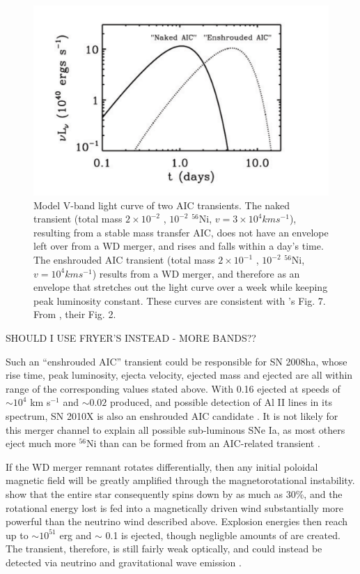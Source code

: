 \begin{figure}
\centerline{\includegraphics[width=0.8\hsize]{AICtrans.pdf}}
\caption{Model V-band light curve of two AIC transients.  The naked transient (total mass $2 \times 10^{-2}$ {\Msun}, $10^{-2}$ {\Msun} $^{56}$Ni, $v = 3 \times 10^4 km s^{-1}$), resulting from a stable mass transfer AIC, does not have an envelope left over from a WD merger, and rises and falls within a day's time.  The enshrouded AIC transient (total mass $2 \times 10^{-1}$ {\Msun}, $10^{-2}$ {\Msun} $^{56}$Ni, $v = 10^4 km s^{-1}$) results from a WD merger, and therefore as an envelope that stretches out the light curve over a week while keeping peak luminosity constant.  These curves are consistent with \cite{frye+09}'s Fig. 7.  From \cite{metz+09}, their Fig. 2.}
\label{AICtrans}
\end{figure}

SHOULD I USE FRYER'S INSTEAD - MORE BANDS??

Such an ``enshrouded AIC'' transient could be responsible for SN 2008ha, whose rise time, peak luminosity, ejecta velocity, ejected mass and ejected {\Ni} are all within range of the corresponding values stated above.  With 0.16 {\Msun} ejected at speeds of $\sim 10^4$ km s$^{-1}$ and $\sim 0.02$ {\Msun} {\Ni} produced, and possible detection of Al II lines in its spectrum, SN 2010X is also an enshrouded AIC candidate \citep{kasl+10}.  It is not likely for this merger channel to explain all possible sub-luminous SNe Ia, as most others eject much more $^{56}$Ni than can be formed from an AIC-related transient \citep{fole+09}.

If the WD merger remnant rotates differentially, then any initial poloidal magnetic field will be greatly amplified through the magnetorotational instability.  \cite{dess+07} show that the entire star consequently spins down by as much as 30\%, and the rotational energy lost is fed into a magnetically driven wind substantially more powerful than the neutrino wind described above.  Explosion energies then reach up to $\sim 10^{51}$ erg and $\sim$ 0.1 {\Msun} is ejected, though negligble amounts of {\Ni} are created.  The transient, therefore, is still fairly weak optically, and could instead be detected via neutrino and gravitational wave emission \citep{dess+07}.

